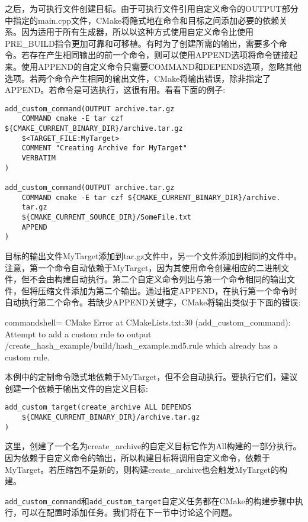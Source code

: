 之后，为可执行文件创建目标。由于可执行文件引用自定义命令的OUTPUT部分中指定的main.cpp文件，CMake将隐式地在命令和目标之间添加必要的依赖关系。因为适用于所有生成器，所以以这种方式使用自定义命令比使用PRE\_BUILD指令更加可靠和可移植。有时为了创建所需的输出，需要多个命令。若存在产生相同输出的前一个命令，则可以使用APPEND选项将命令链接起来。使用APPEND的自定义命令只需要COMMAND和DEPENDS选项，忽略其他选项。若两个命令产生相同的输出文件，CMake将输出错误，除非指定了APPEND。若命令是可选执行，这很有用。看看下面的例子:

\begin{lstlisting}[style=styleCMake]
add_custom_command(OUTPUT archive.tar.gz
	COMMAND cmake -E tar czf ${CMAKE_CURRENT_BINARY_DIR}/archive.tar.gz
	$<TARGET_FILE:MyTarget>
	COMMENT "Creating Archive for MyTarget"
	VERBATIM
)

add_custom_command(OUTPUT archive.tar.gz
	COMMAND cmake -E tar czf ${CMAKE_CURRENT_BINARY_DIR}/archive.
	tar.gz
	${CMAKE_CURRENT_SOURCE_DIR}/SomeFile.txt
	APPEND
)
\end{lstlisting}

目标的输出文件MyTarget添加到tar.gz文件中，另一个文件添加到相同的文件中。注意，第一个命令自动依赖于MyTarget，因为其使用命令创建相应的二进制文件，但不会由构建自动执行。第二个自定义命令列出与第一个命令相同的输出文件，但将压缩文件添加为第二个输出。通过指定APPEND，在执行第一个命令时自动执行第二个命令。若缺少APPEND关键字，CMake将输出类似于下面的错误:

\begin{tcblisting}{commandshell={}}
CMake Error at CMakeLists.txt:30 (add_custom_command):
  Attempt to add a custom rule to output
    /create_hash_example/build/hash_example.md5.rule
  which already has a custom rule.
\end{tcblisting}

本例中的定制命令隐式地依赖于MyTarget，但不会自动执行。要执行它们，建议创建一个依赖于输出文件的自定义目标:

\begin{lstlisting}[style=styleCMake]
add_custom_target(create_archive ALL DEPENDS
	${CMAKE_CURRENT_BINARY_DIR}/archive.tar.gz
)
\end{lstlisting}

这里，创建了一个名为create\_archive的自定义目标它作为All构建的一部分执行。因为依赖于自定义命令的输出，所以构建目标将调用自定义命令，依赖于MyTarget。若压缩包不是新的，则构建create\_archive也会触发MyTarget的构建。

\texttt{add\_custom\_command}和\texttt{add\_custom\_target}自定义任务都在CMake的构建步骤中执行，可以在配置时添加任务。我们将在下一节中讨论这个问题。

